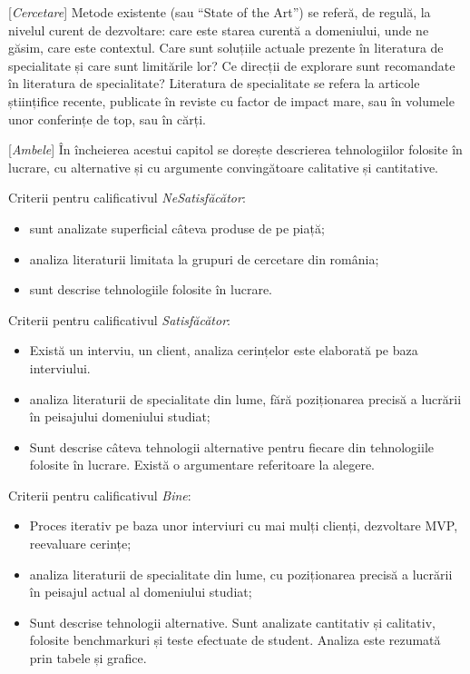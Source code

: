 \documentclass[12pt,a4paper]{report}
\newcommand{\worktype}[1]{[\textit{#1}] }
\newcommand{\dezvoltare}{\worktype{Dezvoltare de produs}}
\newcommand{\cercetare}{\worktype{Cercetare}}
\newcommand{\ambele}{\worktype{Ambele}}
\begin{document}
\cercetare Metode existente (sau ``State of the Art'') se referă, de regulă, la nivelul curent de dezvoltare: care este starea curentă a domeniului, unde ne găsim, care este contextul. Care sunt soluțiile actuale prezente în literatura de specialitate și care sunt limitările lor? Ce direcții de explorare sunt recomandate în literatura de specialitate? Literatura de specialitate se refera la articole științifice recente, publicate în reviste cu factor de impact mare, sau în volumele unor conferințe de top, sau în cărți.

\ambele În încheierea acestui capitol se dorește descrierea tehnologiilor folosite în lucrare, cu alternative și cu argumente convingătoare calitative și cantitative.

Criterii pentru calificativul \textit{Ne\textit{Satisfăcător}}:
\begin{itemize}
	\item \dezvoltare sunt analizate superficial câteva produse de pe piață;
	\item \cercetare analiza literaturii limitata la grupuri de cercetare din românia;
	\item \ambele sunt descrise tehnologiile folosite în lucrare.
\end{itemize}

Criterii pentru calificativul \textit{Satisfăcător}:
\begin{itemize}
	\item \dezvoltare Există un interviu, un client, analiza cerințelor este elaborată pe baza interviului.
	\item \cercetare analiza literaturii de specialitate din lume, fără poziționarea precisă a lucrării în peisajului domeniului studiat;
	\item \ambele Sunt descrise câteva tehnologii alternative pentru fiecare din tehnologiile folosite în lucrare. Există o argumentare referitoare la alegere.
\end{itemize}

Criterii pentru calificativul \textit{Bine}:
\begin{itemize}
	\item \dezvoltare Proces iterativ pe baza unor interviuri cu mai mulți clienți, dezvoltare MVP, reevaluare cerințe;
	\item \cercetare analiza literaturii de specialitate din lume, cu poziționarea precisă a lucrării în peisajul actual al domeniului studiat;
	\item \ambele Sunt descrise tehnologii alternative. Sunt analizate cantitativ și calitativ, folosite benchmarkuri și teste efectuate de student. Analiza este rezumată prin tabele și grafice.
\end{itemize}
\end{document}
